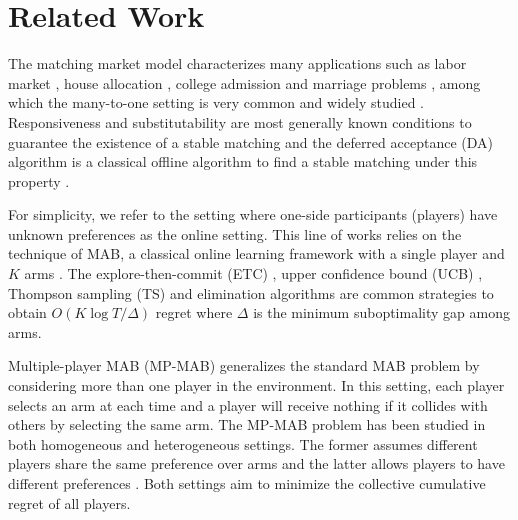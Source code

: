 \section{Related Work}\label{sec:related}

The matching market model characterizes many applications such as labor market \citep{roth1984evolution}, house allocation \citep{abdulkadirouglu1999house}, college admission and marriage problems \citep{gale1962college}, among which the  many-to-one setting is very common and widely studied \citep{roth1992two}. 
Responsiveness and substitutability are most generally known conditions to guarantee the existence of a stable matching \citep{kelso1982job,roth1984stability,roth1992two,abdulkadirouglu2005college} and the deferred acceptance (DA) algorithm is a classical offline algorithm to find a stable matching under this property \citep{kelso1982job,roth1984stability}. 


For simplicity, we refer to the setting where one-side participants (players) have unknown preferences as the online setting. 
This line of works relies on the technique of MAB, a classical online learning framework with a single player and $K$ arms \citep{lattimore2020bandit}. 
The explore-then-commit (ETC) \citep{garivier2016explore}, upper confidence bound (UCB) \citep{auer2002finite}, Thompson sampling (TS) \citep{agrawal2012analysis} and elimination \citep{auer2010ucbelimination} algorithms are common strategies to obtain $O(K\log T/\Delta)$ regret where $\Delta$ is the minimum suboptimality gap among arms. 

Multiple-player MAB (MP-MAB) generalizes the standard MAB problem by considering more than one player in the environment. 
In this setting, each player selects an arm at each time and a player will receive nothing if it collides with others by selecting the same arm. 
The MP-MAB problem has been studied in both homogeneous and heterogeneous settings. The former assumes different players share the same preference over arms \citep{rosenski2016multi,bubeck2021cooperative} and the latter allows players to have different preferences \citep{bistritz2018distributed,shi2021heterogeneous}. 
Both settings aim to minimize the collective cumulative regret of all players. 


